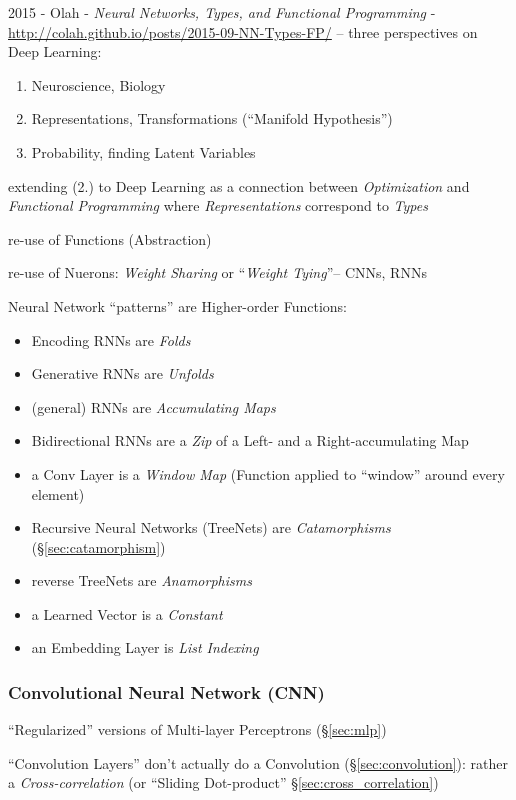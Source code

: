\asterism

2015 - Olah - \emph{Neural Networks, Types, and Functional Programming}
- \url{http://colah.github.io/posts/2015-09-NN-Types-FP/} --
three perspectives on Deep Learning:
\begin{enumerate}
  \item Neuroscience, Biology
  \item Representations, Transformations (``Manifold Hypothesis'')
  \item Probability, finding Latent Variables
\end{enumerate}
extending (2.) to Deep Learning as a connection between \emph{Optimization} and
\emph{Functional Programming} where \emph{Representations} correspond to
\emph{Types}

re-use of Functions (Abstraction)

re-use of Nuerons: \emph{Weight Sharing} or ``\emph{Weight Tying}''-- CNNs, RNNs

Neural Network ``patterns'' are Higher-order Functions:
\begin{itemize}
  \item Encoding RNNs are \emph{Folds}
  \item Generative RNNs are \emph{Unfolds}
  \item (general) RNNs are \emph{Accumulating Maps}
  \item Bidirectional RNNs are a \emph{Zip} of a Left- and a Right-accumulating
    Map
  \item a Conv Layer is a \emph{Window Map} (Function applied to ``window''
    around every element)
  \item Recursive Neural Networks (TreeNets) are \emph{Catamorphisms}
    (\S\ref{sec:catamorphism})
  \item reverse TreeNets are \emph{Anamorphisms}
  \item a Learned Vector is a \emph{Constant}
  \item an Embedding Layer is \emph{List Indexing}
\end{itemize}



\subsubsection{Convolutional Neural Network (CNN)}\label{sec:cnn}

``Regularized'' versions of Multi-layer Perceptrons (\S\ref{sec:mlp})

``Convolution Layers'' don't actually do a Convolution
(\S\ref{sec:convolution}):
rather a \emph{Cross-correlation} (or ``Sliding Dot-product''
\S\ref{sec:cross_correlation})


